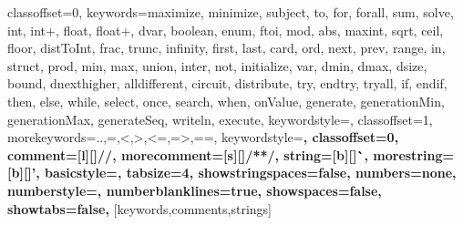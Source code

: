 \documentclass[a4paper,12pt]{article}
\begin{document}
	
%
{
	classoffset=0,
	keywords={maximize, minimize, subject, to, for, forall, sum, solve, int, int+, float, float+, dvar, boolean, enum, ftoi, mod, abs, maxint, sqrt, ceil, floor, distToInt, frac, trunc, infinity, first, last, card, ord, next, prev, range, in, struct, prod, min, max, union, inter, not, initialize, var, dmin, dmax, dsize, bound, dnexthigher, alldifferent, circuit, distribute, try, endtry, tryall, if, endif, then, else, while, select, once, search, when, onValue, generate, generationMin, generationMax, generateSeq, writeln, execute},
	keywordstyle=\color{blue}, %
	classoffset=1,
	morekeywords={..,=,<,>,<=,=>,==},
	keywordstyle=\color{black}\bfseries,
	classoffset=0,
	comment=[l][\color{eclipse-comments}]{//},%
	morecomment=[s][\color{eclipse-comments}]{/*}{*/},%
	string=[b][\color{eclipse-strings}]\``,%
	morestring=[b][\color{eclipse-strings}]',%
	basicstyle=\small, %
	tabsize=4,
	showstringspaces=false,
	numbers=none, %
	numberstyle=\tiny, %
	numberblanklines=true,
	showspaces=false,
	showtabs=false,
}[keywords,comments,strings]%
\end{document}
